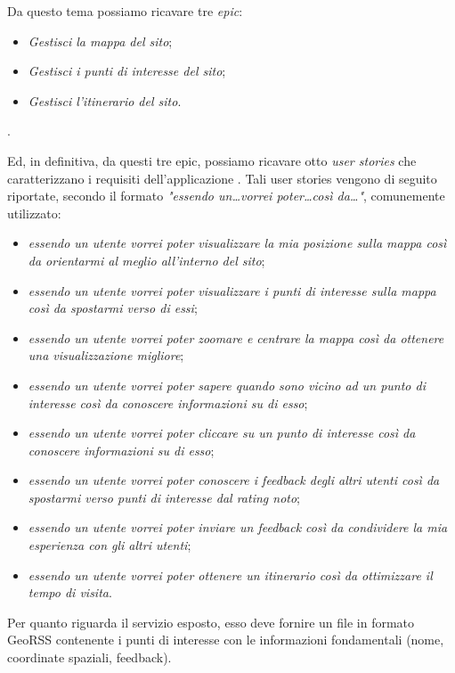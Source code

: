 Da questo tema possiamo ricavare tre \textit{epic}:
\begin{itemize}
\item \textit{Gestisci la mappa del sito};
\item \textit{Gestisci i punti di interesse del sito};
\item \textit{Gestisci l'itinerario del sito}.
\end{itemize}.

Ed, in definitiva, da questi tre epic, possiamo ricavare otto \textit{user stories} che caratterizzano i requisiti dell'applicazione \cite{book:blankenship}. Tali user stories vengono di seguito riportate, secondo il formato \emph{"essendo un\dots vorrei poter\dots così da\dots"}, comunemente utilizzato:

\begin{itemize}
\item \textit{essendo un utente vorrei poter visualizzare la mia posizione sulla mappa così da orientarmi al meglio all'interno del sito};
\item \textit{essendo un utente vorrei poter visualizzare i punti di interesse sulla mappa così da spostarmi verso di essi};
\item \textit{essendo un utente vorrei poter zoomare e centrare la mappa così da ottenere una visualizzazione migliore};
\item \textit{essendo un utente vorrei poter sapere quando sono vicino ad un punto di interesse così da conoscere informazioni su di esso};
\item \textit{essendo un utente vorrei poter cliccare su un punto di interesse così da conoscere informazioni su di esso};
\item \textit{essendo un utente vorrei poter conoscere i feedback degli altri utenti così da spostarmi verso punti di interesse dal rating noto};
\item \textit{essendo un utente vorrei poter inviare un feedback così da condividere la mia esperienza con gli altri utenti};
\item \textit{essendo un utente vorrei poter ottenere un itinerario così da ottimizzare il tempo di visita}.
\end{itemize}


Per quanto riguarda il servizio esposto, esso deve fornire un file in formato GeoRSS contenente i punti di interesse con le informazioni fondamentali (nome, coordinate spaziali, feedback).

